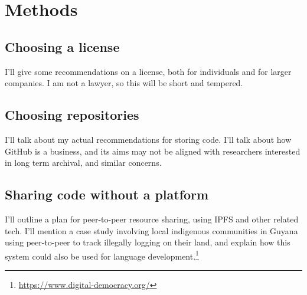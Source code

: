 \section{Methods}\label{sec:methods}

\subsection{Choosing a license}

I'll give some recommendations on a license, both for individuals and for larger companies. I am not a lawyer, so this will be short and tempered.

\subsection{Choosing repositories}

I'll talk about my actual recommendations for storing code. I'll talk about how GitHub is a business, and its aims may not be aligned with researchers interested in long term archival, and similar concerns.


\subsection{Sharing code without a platform}

I'll outline a plan for peer-to-peer resource sharing, using IPFS \citep{benet2014ipfs} and other related tech. I'll mention a case study involving local indigenous communities in Guyana using peer-to-peer to track illegally logging on their land, and explain how this system could also be used for language development.\footnote{\href{https://www.digital-democracy.org/}{https://www.digital-democracy.org/}}
